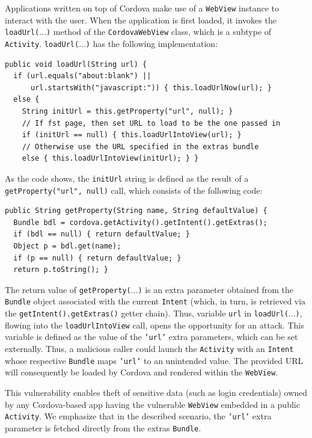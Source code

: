 Applications written on top of Cordova make use of a {\tt WebView} instance to interact with the user. When the application is first loaded, it invokes the {\tt loadUrl($\ldots$)} method of the {\tt CordovaWebView} class, which is a subtype of {\tt Activity}. {\tt loadUrl($\ldots$)} has the following implementation:
\begin{small}
\begin{lstlisting}[showstringspaces=false]
public void loadUrl(String url) {
  if (url.equals("about:blank") || 
      url.startsWith("javascript:")) { this.loadUrlNow(url); }
  else {
    String initUrl = this.getProperty("url", null); }
    // If fst page, then set URL to load to be the one passed in
    if (initUrl == null) { this.loadUrlIntoView(url); }
    // Otherwise use the URL specified in the extras bundle
    else { this.loadUrlIntoView(initUrl); } }
\end{lstlisting}
\end{small}
As the code shows, the {\tt initUrl} string is defined as the result of a  {\tt getProperty("url", null)} call, which consists of the following code:
\begin{small}
\begin{lstlisting}[showstringspaces=false]
public String getProperty(String name, String defaultValue) {
  Bundle bdl = cordova.getActivity().getIntent().getExtras();
  if (bdl == null) { return defaultValue; }
  Object p = bdl.get(name);
  if (p == null) { return defaultValue; }
  return p.toString(); }
\end{lstlisting}
\end{small}
The return value of {\tt getProperty($\ldots$)} is an extra parameter obtained from the {\tt Bundle} object associated with the current {\tt Intent} (which, in turn, is retrieved via the {\tt getIntent().getExtras()} getter chain). Thus, variable {\tt url} in {\tt loadUrl($\ldots$)}, flowing into the {\tt loadUrlIntoView} call, opens the opportunity for an attack. This variable is defined
as the value of the {\tt 'url'} extra parameters, which can be set externally.  
Thus, a malicious caller could launch the {\tt Activity} with an {\tt Intent} whose respective {\tt Bundle} maps {\tt 'url'} to an unintended value. The provided URL will consequently be loaded by Cordova and rendered within the {\tt WebView}.

This vulnerability enables theft of sensitive data (such as login credentials) owned by any Cordova-based app having the vulnerable {\tt WebView} embedded in a public {\tt Activity}.
We emphasize that in the described scenario, the {\tt 'url'} extra parameter is fetched directly from the extras {\tt Bundle}. 

